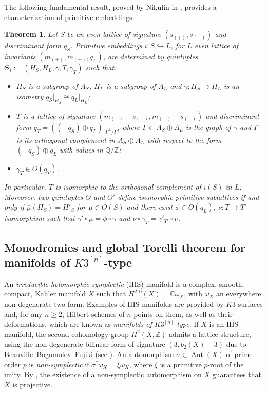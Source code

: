 \documentclass{amsart}
\newtheorem{theorem}{Theorem}[section]
\theoremstyle{definition}
\newcommand{\ra}{\rightarrow}
\newcommand{\IZ}{\mathbb{Z}}
\newcommand{\IQ}{\mathbb{Q}}
\newcommand{\coloneqq}{:=}
\newcommand{\hskn}{K3^{\left[n\right]}}
\DeclareMathOperator{\aut}{Aut}
\begin{document}
The following fundamental result, proved by Nikulin in \cite[Proposition 1.15.1]{nikulin}, provides a characterization of primitive embeddings.

\begin{theorem}\label{nik embedd}
Let $S$ be an even lattice of signature $(s_{(+)}, s_{(-)})$ and discriminant form $q_S$. Primitive embeddings $i: S \hookrightarrow L$, for $L$ even lattice of invariants $(m_{(+)},m_{(-)},q_L)$, are determined by quintuples $\Theta_i \coloneqq (H_S,H_L,\gamma, T, \gamma_T)$ such that:
\begin{itemize}
\item $H_S$ is a subgroup of $A_S$, $H_L$ is a subgroup of $A_L$ and $\gamma: H_S \ra H_L$ is an isometry $q_{S}\rvert_{H_S} \cong q_{L}\rvert_{H_L}$;
\item $T$ is a lattice of signature $(m_{(+)}-s_{(+)}, m_{(-)}-s_{(-)})$ and discriminant form $q_T = ((-q_S)\oplus q_L)\rvert_{\Gamma^\perp/\Gamma}$, where $\Gamma \subset A_S \oplus A_L$ is the graph of $\gamma$ and $\Gamma^\perp$ is its orthogonal complement in $A_S \oplus A_L$ with respect to the form $(-q_S) \oplus q_L$ with values in $\IQ/\IZ$;
\item $\gamma_T \in O(q_T)$. 
\end{itemize}
In particular, $T$ is isomorphic to the orthogonal complement of $i(S)$ in $L$. Moreover, two quintuples $\Theta$ and $\Theta'$ define isomorphic primitive sublattices if and only if $\bar{\mu}(H_S) = H'_S$ for \mbox{$\mu \in O(S)$} and there exist $\phi \in O(q_L)$, $\nu: T \ra T'$ isomorphism such that $\gamma' \circ \bar{\mu} = \phi \circ \gamma$ and $\bar{\nu} \circ \gamma_T = \gamma'_{T'} \circ \bar{\nu}$.
\end{theorem}

\subsection{Monodromies and global Torelli theorem for manifolds of $\hskn$-type}\label{monodromies}
An \emph{irreducible holomorphic symplectic} (IHS) manifold is a complex, smooth, compact, K\"ahler manifold $X$ such that $H^{2,0}(X) = \mathbb{C}\omega_X$, with $\omega_X$ an everywhere non-degenerate two-form. Examples of IHS manifolds are provided by $K3$ surfaces and, for any $n \geq 2$, Hilbert schemes of $n$ points on them, as well as their deformations, which are known as {\it manifolds of $\hskn$-type}. If $X$ is an IHS manifold, the second cohomology group $H^2(X, \IZ)$ admits a lattice structure, using the non-degenerate bilinear form of signature $(3, b_2(X) - 3)$ due to Beauville--Bogomolov--Fujiki (see \cite{beauville}). An automorphism $\sigma \in \aut(X)$ of prime order $p$ is \emph{non-symplectic} if $\sigma^*\omega_X = \xi \omega_X$, where $\xi$ is a primitive $p$-root of the unity. By \cite[\S 4]{beauville_rmks}, the existence of a non-symplectic automorphism on $X$ guarantees that $X$ is projective.   
\end{document}
